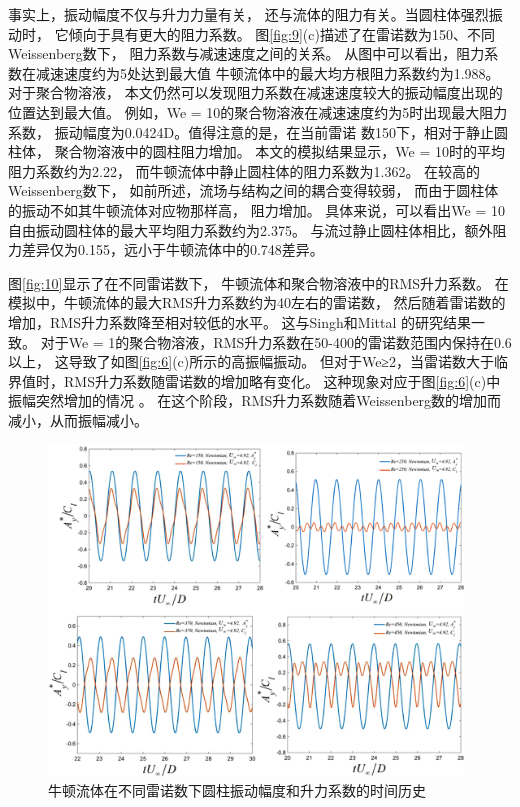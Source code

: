 \documentclass[UTF8,zihao=5]{ctexart} %
\begin{document}
事实上，振动幅度不仅与升力力量有关，
还与流体的阻力有关。当圆柱体强烈振动时，
它倾向于具有更大的阻力系数。
图\ref{fig:9}(c)描述了在雷诺数为150、不同Weissenberg数下，
阻力系数与减速速度之间的关系。
从图中可以看出，阻力系数在减速速度约为5处达到最大值
牛顿流体中的最大均方根阻力系数约为1.988。对于聚合物溶液，
本文仍然可以发现阻力系数在减速速度较大的振动幅度出现的位置达到最大值。
例如，We = 10的聚合物溶液在减速速度约为5时出现最大阻力系数，
振动幅度为0.0424D。值得注意的是，在当前雷诺
数150下，相对于静止圆柱体，
聚合物溶液中的圆柱阻力增加。
本文的模拟结果显示，We = 10时的平均阻力系数约为2.22，
而牛顿流体中静止圆柱体的阻力系数为1.362。
在较高的Weissenberg数下，
如前所述，流场与结构之间的耦合变得较弱，
而由于圆柱体的振动不如其牛顿流体对应物那样高，
阻力增加。
具体来说，可以看出We = 10自由振动圆柱体的最大平均阻力系数约为2.375。
与流过静止圆柱体相比，额外阻力差异仅为0.155，远小于牛顿流体中的0.748差异。

图\ref{fig:10}显示了在不同雷诺数下，
牛顿流体和聚合物溶液中的RMS升力系数。
在模拟中，牛顿流体的最大RMS升力系数约为40左右的雷诺数，
然后随着雷诺数的增加，RMS升力系数降至相对较低的水平。
这与Singh和Mittal 的研究结果一致。
对于We = 1的聚合物溶液，RMS升力系数在50-400的雷诺数范围内保持在0.6以上，
这导致了如图\ref{fig:6}(c)所示的高振幅振动。
但对于We≥2，当雷诺数大于临界值时，RMS升力系数随雷诺数的增加略有变化。
这种现象对应于图\ref{fig:6}(c)中振幅突然增加的情况
。
在这个阶段，RMS升力系数随着Weissenberg数的增加而减小，从而振幅减小。

\begin{figure}[htbp]
    \centering
    \includegraphics[width=11cm]{fig11.jpg}
    \caption{
        牛顿流体在不同雷诺数下圆柱振动幅度和升力系数的时间历史
    }
    \label{fig:11}
\end{figure}
\end{document}
